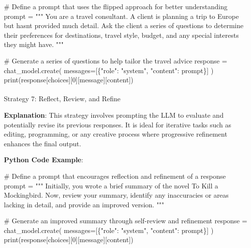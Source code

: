 \documentclass[
]{agujournal2019}
\makeatletter
\let\oldparagraph\paragraph
\renewcommand{\paragraph}{
    \@ifstar
      \xxxParagraphStar
      \xxxParagraphNoStar
  }
\newcommand{\xxxParagraphStar}[1]{\oldparagraph*{#1}\mbox{}}
\newcommand{\xxxParagraphNoStar}[1]{\oldparagraph{#1}\mbox{}}
\newenvironment{Shaded}{\begin{snugshade}}{\end{snugshade}}
\newcommand{\BuiltInTok}[1]{\textcolor[rgb]{0.00,0.23,0.31}{#1}}
\newcommand{\CommentTok}[1]{\textcolor[rgb]{0.37,0.37,0.37}{#1}}
\newcommand{\DecValTok}[1]{\textcolor[rgb]{0.68,0.00,0.00}{#1}}
\newcommand{\NormalTok}[1]{\textcolor[rgb]{0.00,0.23,0.31}{#1}}
\newcommand{\OperatorTok}[1]{\textcolor[rgb]{0.37,0.37,0.37}{#1}}
\newcommand{\StringTok}[1]{\textcolor[rgb]{0.13,0.47,0.30}{#1}}
\makeatother
\begin{document}
\begin{Shaded}
\begin{Highlighting}[]
\CommentTok{\# Define a prompt that uses the flipped approach for better understanding}
\NormalTok{prompt }\OperatorTok{=} \StringTok{"""}
\StringTok{You are a travel consultant. A client is planning a trip to Europe but hasn\textquotesingle{}t provided much detail. Ask the client a series of questions to determine their preferences for destinations, travel style, budget, and any special interests they might have.}
\StringTok{"""}

\CommentTok{\# Generate a series of questions to help tailor the travel advice}
\NormalTok{response }\OperatorTok{=}\NormalTok{ chat\_model.create(}
\NormalTok{    messages}\OperatorTok{=}\NormalTok{[\{}\StringTok{"role"}\NormalTok{: }\StringTok{"system"}\NormalTok{, }\StringTok{"content"}\NormalTok{: prompt\}]}
\NormalTok{)}
\BuiltInTok{print}\NormalTok{(response[}\StringTok{\textquotesingle{}choices\textquotesingle{}}\NormalTok{][}\DecValTok{0}\NormalTok{][}\StringTok{\textquotesingle{}message\textquotesingle{}}\NormalTok{][}\StringTok{\textquotesingle{}content\textquotesingle{}}\NormalTok{])}
\end{Highlighting}
\end{Shaded}

\paragraph{Strategy 7: Reflect, Review, and
Refine}\label{strategy-7-reflect-review-and-refine}

\textbf{Explanation}: This strategy involves prompting the LLM to
evaluate and potentially revise its previous responses. It is ideal for
iterative tasks such as editing, programming, or any creative process
where progressive refinement enhances the final output.

\textbf{Python Code Example}:

\begin{Shaded}
\begin{Highlighting}[]
\CommentTok{\# Define a prompt that encourages reflection and refinement of a response}
\NormalTok{prompt }\OperatorTok{=} \StringTok{"""}
\StringTok{Initially, you wrote a brief summary of the novel \textquotesingle{}To Kill a Mockingbird\textquotesingle{}. Now, review your summary, identify any inaccuracies or areas lacking in detail, and provide an improved version.}
\StringTok{"""}

\CommentTok{\# Generate an improved summary through self{-}review and refinement}
\NormalTok{response }\OperatorTok{=}\NormalTok{ chat\_model.create(}
\NormalTok{    messages}\OperatorTok{=}\NormalTok{[\{}\StringTok{"role"}\NormalTok{: }\StringTok{"system"}\NormalTok{, }\StringTok{"content"}\NormalTok{: prompt\}]}
\NormalTok{)}
\BuiltInTok{print}\NormalTok{(response[}\StringTok{\textquotesingle{}choices\textquotesingle{}}\NormalTok{][}\DecValTok{0}\NormalTok{][}\StringTok{\textquotesingle{}message\textquotesingle{}}\NormalTok{][}\StringTok{\textquotesingle{}content\textquotesingle{}}\NormalTok{])}
\end{Highlighting}
\end{Shaded}
\end{document}
